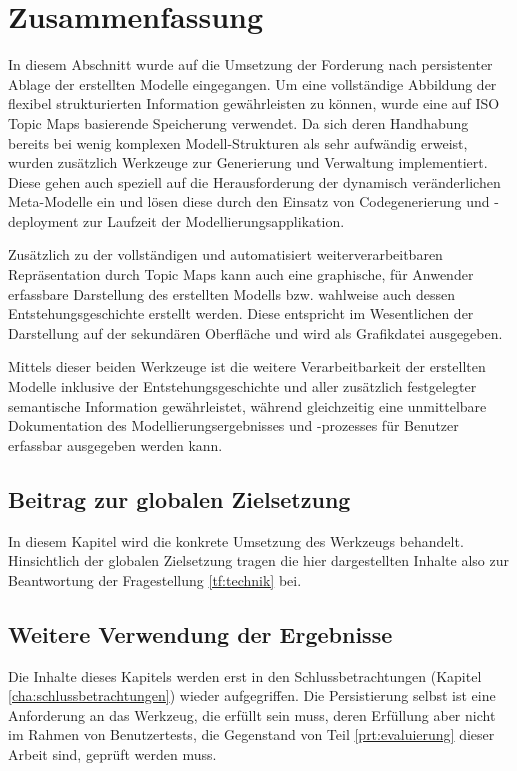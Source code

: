 
\section{Zusammenfassung} %
\label{sec:persistierung_zusammenfassung}

In diesem Abschnitt wurde auf die Umsetzung der Forderung nach persistenter Ablage der erstellten Modelle eingegangen. Um eine vollständige Abbildung der flexibel strukturierten Information gewährleisten zu können, wurde eine auf ISO Topic Maps basierende Speicherung verwendet. Da sich deren Handhabung bereits bei wenig komplexen Modell-Strukturen als sehr aufwändig erweist, wurden zusätzlich Werkzeuge zur Generierung und Verwaltung implementiert. Diese gehen auch speziell auf die Herausforderung der dynamisch veränderlichen Meta-Modelle ein und lösen diese durch den Einsatz von Codegenerierung und -deployment zur Laufzeit der Modellierungsapplikation.

Zusätzlich zu der vollständigen und automatisiert weiterverarbeitbaren Repräsentation durch Topic Maps kann auch eine graphische, für Anwender erfassbare Darstellung des erstellten Modells bzw. wahlweise auch dessen Entstehungsgeschichte erstellt werden. Diese entspricht im Wesentlichen der Darstellung auf der sekundären Oberfläche und wird als Grafikdatei ausgegeben. 

Mittels dieser beiden Werkzeuge ist die weitere Verarbeitbarkeit der erstellten Modelle inklusive der Entstehungsgeschichte und aller zusätzlich festgelegter semantische Information gewährleistet, während gleichzeitig eine unmittelbare Dokumentation des Modellierungsergebnisses und -prozesses für Benutzer erfassbar ausgegeben werden kann.

\subsection{Beitrag zur globalen Zielsetzung}

In diesem Kapitel wird die konkrete Umsetzung des Werkzeugs behandelt. Hinsichtlich der globalen Zielsetzung tragen die hier dargestellten Inhalte also zur Beantwortung der Fragestellung \ref{tf:technik} bei.

\subsection{Weitere Verwendung der Ergebnisse}

Die Inhalte dieses Kapitels werden erst in den Schlussbetrachtungen (Kapitel \ref{cha:schlussbetrachtungen}) wieder aufgegriffen. Die Persistierung selbst ist eine Anforderung an das Werkzeug, die erfüllt sein muss, deren Erfüllung aber nicht im Rahmen von Benutzertests, die Gegenstand von Teil \ref{prt:evaluierung} dieser Arbeit sind, geprüft werden muss.

